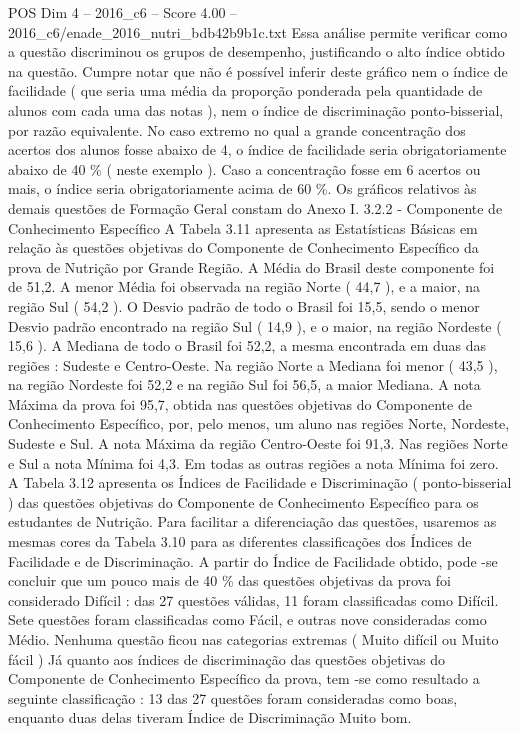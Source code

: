 \begin{textsample}{POS Dim 4 – 2016\_c6 – Score 4.00 – 2016\_c6/enade\_2016\_nutri\_bdb42b9b1c.txt}
Essa análise permite verificar como a questão discriminou os grupos de desempenho, justificando o alto índice obtido na questão.
Cumpre notar que não é possível inferir deste gráfico nem o índice de facilidade ( que seria uma média da proporção ponderada pela quantidade de alunos com cada uma das notas ), nem o índice de discriminação ponto-bisserial, por razão equivalente.
No caso extremo no qual a grande concentração dos acertos dos alunos fosse abaixo de 4, o índice de facilidade seria obrigatoriamente abaixo de 40 \% ( neste exemplo ).
Caso a concentração fosse em 6 acertos ou mais, o índice seria obrigatoriamente acima de 60 \%.
Os gráficos relativos às demais questões de Formação Geral constam do Anexo I. 3.2.2 - Componente de Conhecimento Específico A Tabela 3.11 apresenta as Estatísticas Básicas em relação às questões objetivas do Componente de Conhecimento Específico da prova de Nutrição por Grande Região.
A Média do Brasil deste componente foi de 51,2.
A menor Média foi observada na região Norte ( 44,7 ), e a maior, na região Sul ( 54,2 ).
O Desvio padrão de todo o Brasil foi 15,5, sendo o menor Desvio padrão encontrado na região Sul ( 14,9 ), e o maior, na região Nordeste ( 15,6 ).
A Mediana de todo o Brasil foi 52,2, a mesma encontrada em duas das regiões : Sudeste e Centro-Oeste.
Na região Norte a Mediana foi menor ( 43,5 ), na região Nordeste foi 52,2 e na região Sul foi 56,5, a maior Mediana.
A nota Máxima da prova foi 95,7, obtida nas questões objetivas do Componente de Conhecimento Específico, por, pelo menos, um aluno nas regiões Norte, Nordeste, Sudeste e Sul.
A nota Máxima da região Centro-Oeste foi 91,3.
Nas regiões Norte e Sul a nota Mínima foi 4,3.
Em todas as outras regiões a nota Mínima foi zero.
A Tabela 3.12 apresenta os Índices de Facilidade e Discriminação ( ponto-bisserial ) das questões objetivas do Componente de Conhecimento Específico para os estudantes de Nutrição.
Para facilitar a diferenciação das questões, usaremos as mesmas cores da Tabela 3.10 para as diferentes classificações dos Índices de Facilidade e de Discriminação.
A partir do Índice de Facilidade obtido, pode -se concluir que um pouco mais de 40 \% das questões objetivas da prova foi considerado Difícil : das 27 questões válidas, 11 foram classificadas como Difícil.
Sete questões foram classificadas como Fácil, e outras nove consideradas como Médio.
Nenhuma questão ficou nas categorias extremas ( Muito difícil ou Muito fácil ) Já quanto aos índices de discriminação das questões objetivas do Componente de Conhecimento Específico da prova, tem -se como resultado a seguinte classificação : 13 das 27 questões foram consideradas como boas, enquanto duas delas tiveram Índice de Discriminação Muito bom.

\end{textsample}
